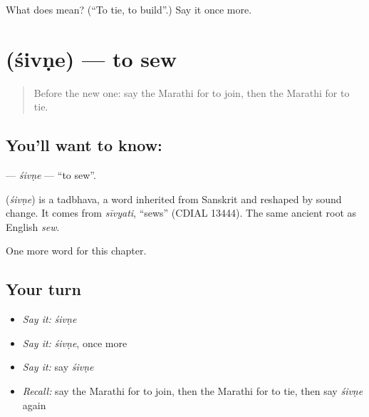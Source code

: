\begin{tcolorbox}[breakable,colback=teal!4,colframe=teal!35!black,title={Before you move on}]
What does  mean? (\textquotedblleft{}To tie, to build\textquotedblright{}.) Say it once more.
\end{tcolorbox}
\section[\texorpdfstring{\mr{शिवणे} (śivṇe)}{शिवणे (śivṇe)}]{ (śivṇe) — to sew}

\label{lesson:MR-C155-sivne}



\begin{quote}
Before the new one: say the Marathi for to join, then the Marathi for to tie.
\end{quote}

\subsection*{You'll want to know: }
\textbf{} — \emph{śivṇe} — \textquotedblleft{}to sew\textquotedblright{}.

\begin{cousinweb}
\textbf{} (\emph{śivṇe}) is a tadbhava, a word inherited from Sanskrit and reshaped by sound change. It comes from \emph{sīvyati}, \textquotedblleft{}sews\textquotedblright{} (CDIAL 13444). The same ancient root as English \emph{sew}.
\end{cousinweb}

\begin{grammarlens}[title={What you've built}]
One more word for this chapter.
\end{grammarlens}

\subsection*{Your turn}
\begin{itemize}
\raggedright
  \item \emph{Say it:} \emph{śivṇe}
  \item \emph{Say it:} \emph{śivṇe}, once more
  \item \emph{Say it:} say \emph{śivṇe}
  \item \emph{Recall:} say the Marathi for to join, then the Marathi for to tie, then say \emph{śivṇe} again
\end{itemize}

